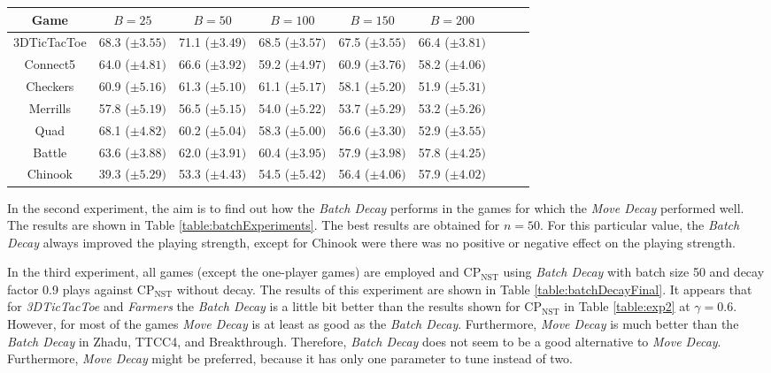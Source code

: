 \documentclass[journal]{IEEEtran}
\begin{document}
\begin{table*}[t]
\caption{Win \%  of CP$_{\textrm{NST}}$ using Batch Decay with batch size $B$ and decay factor $\lambda=0.9$ against CP$_{\textrm{NST}}$ without decay, startclock$=$60s, playclock$=$30s, on gogeneral}
\label{table:batchExperiments}
\centering
\begin{tabular}{|c|c|c|c|c|c|c|c|c|}
\hline
 \textbf{Game} & $ B = 25$ & $ B = 50$ & $ B = 100$ & $ B = 150$ & $ B = 200$ \\
\hline\hline
3DTicTacToe & 68.3 ($\pm 3.55)$ & 71.1 ($\pm 3.49)$ & 68.5 ($\pm 3.57)$  & 67.5 ($\pm 3.55)$ & 66.4 ($\pm 3.81)$\\ 
Connect5 & 64.0 ($\pm 4.81)$ & 66.6 ($\pm 3.92)$ & 59.2 ($\pm 4.97)$ & 60.9 ($\pm 3.76)$ & 58.2 ($\pm 4.06)$\\ 
Checkers & 60.9 ($\pm 5.16)$ & 61.3 ($\pm 5.10)$ & 61.1 ($\pm 5.17)$ & 58.1 ($\pm 5.20)$ & 51.9 ($\pm 5.31)$\\ 
Merrills & 57.8 ($\pm 5.19)$ & 56.5 ($\pm 5.15)$ & 54.0 ($\pm 5.22)$ & 53.7 ($\pm 5.29)$ & 53.2 ($\pm 5.26)$\\ 
Quad & 68.1 ($\pm 4.82)$ & 60.2 ($\pm 5.04)$ & 58.3 ($\pm 5.00)$  & 56.6 ($\pm 3.30)$ & 52.9 ($\pm 3.55)$\\ 
\hline
Battle & 63.6 ($\pm 3.88)$ & 62.0 ($\pm 3.91)$ & 60.4 ($\pm 3.95)$ & 57.9 ($\pm 3.98)$ & 57.8 ($\pm 4.25)$\\ 
Chinook & 39.3 ($\pm 5.29)$ & 53.3 ($\pm 4.43)$ & 54.5 ($\pm 5.42)$ & 56.4 ($\pm 4.06)$ & 57.9 ($\pm 4.02)$\\ 
 \hline
\end{tabular}
\end{table*}
In the second experiment, the aim is to find out how the \textit{Batch Decay} performs in the games for which the \textit{Move Decay} performed well. The results are shown in Table \ref{table:batchExperiments}. The best results are obtained for $n=50$. For this particular value, the \textit{Batch Decay} always improved the playing strength, except for Chinook were there was no positive or negative effect on the playing strength.

In the third experiment, all games (except the one-player games) are employed and CP$_{\textrm{NST}}$ using \textit{Batch Decay} with batch size 50 and decay factor 0.9 plays against CP$_{\textrm{NST}}$ without decay. The results of this experiment are shown in Table \ref{table:batchDecayFinal}. It appears that for \textit{3DTicTacToe} and \textit{Farmers} the \textit{Batch Decay} is a little bit better than the results shown for CP$_{\textrm{NST}}$ in Table \ref{table:exp2} at $\gamma=0.6$. However, for most of the games \textit{Move Decay} is at least as good as the \textit{Batch Decay}. Furthermore, \textit{Move Decay} is much better than the \textit{Batch Decay} in Zhadu, TTCC4, and Breakthrough. Therefore, \textit{Batch Decay} does not seem to be a good alternative to \textit{Move Decay}. Furthermore, \textit{Move Decay} might be preferred, because it has only one parameter to tune instead of two.
\end{document}
